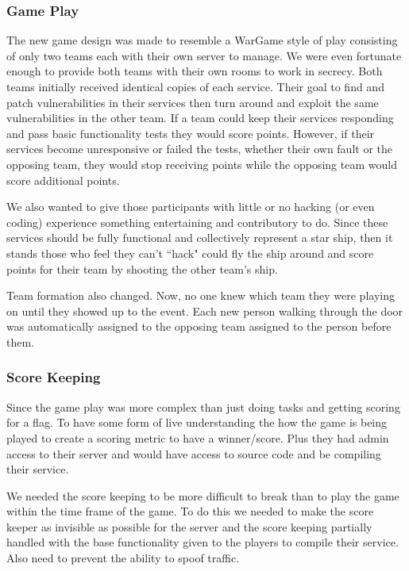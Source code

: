 \documentclass[10pt]{article}
\begin{document}
\subsubsection{Game Play}
\label{stgameplay}
The new game design was made to resemble a WarGame style of play consisting of
only two teams each with their own server to manage. We were even fortunate
enough to provide both teams with their own rooms to work in secrecy. Both
teams initially received identical copies of each service. Their goal to find
and patch vulnerabilities in their services then turn around and exploit the
same vulnerabilities in the other team. If a team could keep their services
responding and pass basic functionality tests they would score points. However,
if their services become unresponsive or failed the tests, whether their own
fault or the opposing team, they would stop receiving points while the opposing
team would score additional points.

We also wanted to give those participants with little or no hacking (or even
coding) experience something entertaining and contributory to do. Since these
services should be fully functional and collectively represent a star ship, then
it stands those who feel they can't ``hack" could fly the ship around and
score points for their team by shooting the other team's ship.

Team formation also changed. Now, no one knew which team they were playing on
until they showed up to the event. Each new person walking through the door was
automatically assigned to the opposing team assigned to the person before them.

\subsubsection{Score Keeping}
\label{stscorekeeping}
Since the game play was more complex than just doing tasks and getting scoring
for a flag. To have some form of live understanding the how the game is being
played to create a scoring metric to have a winner/score. Plus they had
admin access to their server and would have access to source code and be compiling
their service.

We needed the score keeping to be more difficult to break than to play the game 
within the time frame of the game. To do this we needed to make the score keeper
as invisible as possible for the server and the score keeping partially handled with
the base functionality given to the players to compile their service. Also need
to prevent the ability to spoof traffic.
\end{document}
